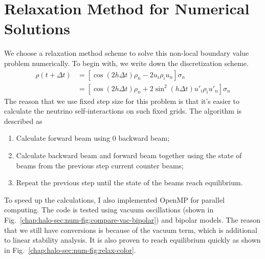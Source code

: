 \section{\label{chap:halo-sec:num}Relaxation Method for Numerical Solutions}


We choose a relaxation method scheme to solve this non-local boundary value problem numerically. To begin with, we write down the discretization scheme.
\begin{align}
    \rho(t+\Delta t) &= \left[  \cos( 2 h \Delta t)\rho_n -  2 u_i \rho_i u_n \right]\sigma_n \\
    &= \left[  \cos( 2 h \Delta t) \rho_n +  2 \sin^2(h \Delta t) u'_i \rho_i u'_n \right]\sigma_n
\end{align}
The reason that we use fixed step size for this problem is that it's easier to calculate the neutrino self-interactions on such fixed grids. The algorithm is described as
\begin{enumerate}
    \item
Calculate forward beam using 0 backward beam;
\item
Calculate backward beam and forward beam together using the state of beams from the previous step current counter beams;
\item
Repeat the previous step until the state of the beams reach equilibrium.
\end{enumerate}
To speed up the calculations, I also implemented OpenMP for parallel computing. The code is tested using vacuum oscillations (shown in Fig.~\ref{chap:halo-sec:num-fig:compare-vac-bipolar}) and bipolar models. The reason that we still have conversions is because of the vacuum term, which is additional to linear stability analysis. It is also proven to reach equilibrium quickly as shown in Fig.~\ref{chap:halo-sec:num-fig:relax-color}. 

